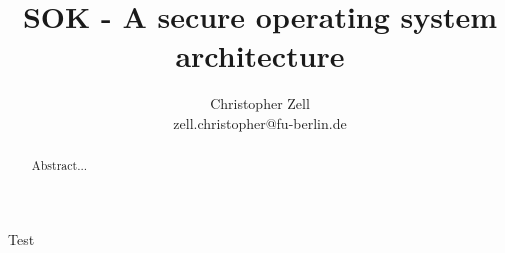 \documentclass[9pt,technote]{IEEEtran}
\title{SOK - A secure operating system architecture}
\author{Christopher Zell\\
        zell.christopher@fu-berlin.de}
\begin{document}
\maketitle

  \begin{abstract}
    Abstract...
  \end{abstract}
Test
\end{document}
